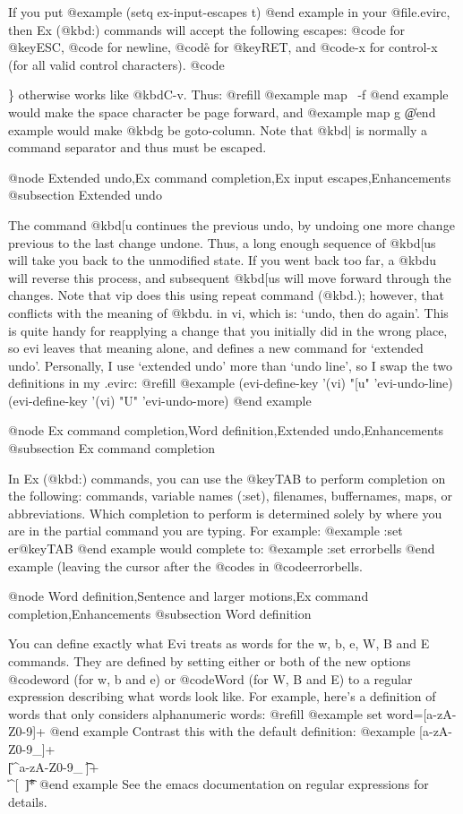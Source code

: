 If you put
@example
(setq ex-input-escapes t)
@end example
in your @file{.evirc}, then
Ex (@kbd{:}) commands will accept the
following escapes: @code{\e} for @key{ESC},
@code{\n} for newline, @code{\r} for @key{RET},
and @code{\C-x} for control-x (for all valid control characters).
@code{\} otherwise works like @kbd{C-v}.  Thus: @refill
@example
map \  \C-f
@end example
would make the space character be page forward, and
@example
map g \|
@end example
would make @kbd{g} be goto-column.  Note that @kbd{|} is normally a command
separator and thus must be escaped.

@node Extended undo,Ex command completion,Ex input escapes,Enhancements
@subsection Extended undo

The command @kbd{[u} continues the previous undo, by undoing one more change
previous to the last change undone.  Thus, a long enough sequence of
@kbd{[u}s will take you back to the unmodified state.  If you went back too
far, a @kbd{u} will reverse this process, and subsequent @kbd{[u}s will
move forward through the changes.
Note that vip does this using repeat command (@kbd{.}); however,
that conflicts with the meaning of @kbd{u.} in vi, which is: `undo, then do
again'.  This is quite handy for reapplying a change that you initially
did in the wrong place, so evi leaves that meaning alone, and
defines a new command for `extended undo'.
Personally, I use `extended undo' more than `undo line', so I swap
the two definitions in my .evirc: @refill
@example
(evi-define-key '(vi) "[u" 'evi-undo-line)
(evi-define-key '(vi) "U" 'evi-undo-more)
@end example

@node Ex command completion,Word definition,Extended undo,Enhancements
@subsection Ex command completion

In Ex (@kbd{:}) commands, you can use the @key{TAB} to perform completion
on the following: commands, variable names (:set), filenames, buffernames,
maps, or abbreviations.  Which completion to perform is determined solely
by where you are in the partial command you are typing.  For example:
@example
:set er@key{TAB}
@end example
would complete to:
@example
:set errorbells
@end example
(leaving the cursor after the @code{s} in @code{errorbells}.

@node Word definition,Sentence and larger motions,Ex command completion,Enhancements
@subsection Word definition

You can define exactly what Evi treats as words for the w, b, e, W, B
and E commands.  They are defined by setting either or both of the new
options @code{word} (for w, b and e) or
@code{Word} (for W, B and E) to a regular
expression describing what words look like.  For example, here's a
definition of words that only considers alphanumeric words: @refill
@example
set word=[a-zA-Z0-9]+
@end example
Contrast this with the default definition:
@example
[a-zA-Z0-9_]+\\\|[^a-zA-Z0-9_\ \t\n]+\\\|^[\ \t]*\n
@end example
See the emacs documentation on regular expressions for details.

}
